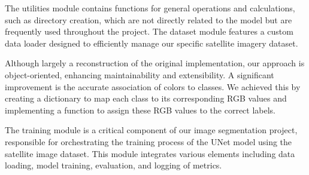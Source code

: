 \documentclass{article}
\begin{document}
The utilities module contains functions for general operations and calculations, such as directory creation, which are not directly related to the model but are frequently used throughout the project. The dataset module features a custom data loader designed to efficiently manage our specific satellite imagery dataset.

Although largely a reconstruction of the original implementation, our approach is object-oriented, enhancing maintainability and extensibility. A significant improvement is the accurate association of colors to classes. We achieved this by creating a dictionary to map each class to its corresponding RGB values and implementing a function to assign these RGB values to the correct labels.

The training module is a critical component of our image segmentation project, responsible for orchestrating the training process of the UNet model using the satellite image dataset. This module integrates various elements including data loading, model training, evaluation, and logging of metrics.
\end{document}
